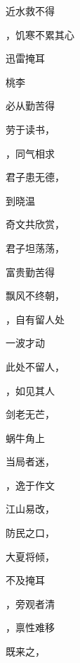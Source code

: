 \documentclass[12pt, a4paper, addpoints]{exam}
\begin{document}
\begin{multicols}{2}
\begin{questions}
\question[2] 近水救不得\uline{\qquad\qquad\qquad}

\question[2] \uline{\qquad\qquad\qquad}，饥寒不累其心

\question[2] 迅雷\uline{\qquad\qquad\qquad}掩耳

\question[2] 桃李\uline{\qquad\qquad\qquad}

\question[2] \uline{\qquad\qquad\qquad}必从勤苦得

\question[2] 劳于读书，\uline{\qquad\qquad\qquad}

\question[2] \uline{\qquad\qquad\qquad}，同气相求

\question[2] 君子患无德，\uline{\qquad\qquad\qquad}

\question[2] \uline{\qquad\qquad\qquad}到晓温

\question[2] 奇文共欣赏，\uline{\qquad\qquad\qquad}

\question[2] 君子坦荡荡，\uline{\qquad\qquad\qquad}

\question[2] 富贵\uline{\qquad\qquad\qquad}勤苦得

\question[2] 飘风不终朝，\uline{\qquad\qquad\qquad}

\question[2] \uline{\qquad\qquad\qquad}，自有留人处

\question[2] 一波才动\uline{\qquad\qquad\qquad}

\question[2] 此处不留人，\uline{\qquad\qquad\qquad}

\question[2] \uline{\qquad\qquad\qquad}，如见其人

\question[2] 剑老无芒，\uline{\qquad\qquad\qquad}

\question[2] 蜗牛角上\uline{\qquad\qquad\qquad}

\question[2] 当局者迷，\uline{\qquad\qquad\qquad}

\question[2] \uline{\qquad\qquad\qquad}，逸于作文

\question[2] 江山易改，\uline{\qquad\qquad\qquad}

\question[2] 防民之口，\uline{\qquad\qquad\qquad}

\question[2] 大夏将倾，\uline{\qquad\qquad\qquad}

\question[2] \uline{\qquad\qquad\qquad}不及掩耳

\question[2] \uline{\qquad\qquad\qquad}，旁观者清

\question[2] \uline{\qquad\qquad\qquad}，禀性难移

\question[2] 既来之，\uline{\qquad\qquad\qquad}


\end{questions}
\end{multicols}
\end{document}
